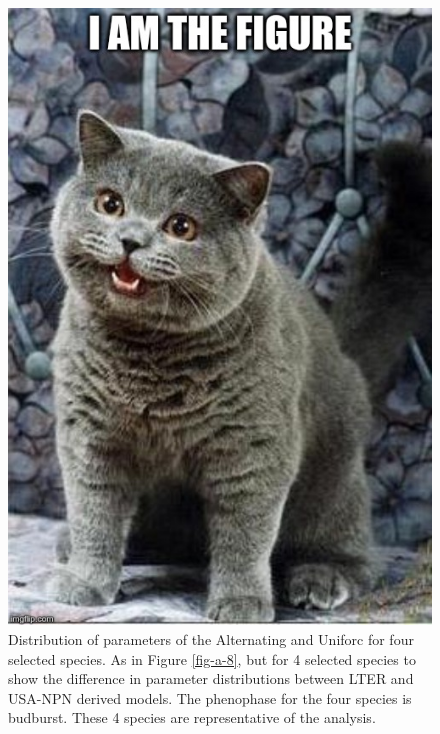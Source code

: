 \begin{figure}
	\centering
	\includegraphics[scale=0.5]{images/figure_filler.jpg}
	\caption[Distribution of parameters of the Alternating and Uniforc models for four selected species]{Distribution of parameters of the Alternating and Uniforc for four selected species. As in Figure \ref{fig-a-8}, but for 4 selected species to show the difference in parameter distributions between LTER and USA-NPN derived models. The phenophase for the four species is budburst. These 4 species are representative of the analysis.} \label{fig-a-11}
\end{figure}


\newpage



